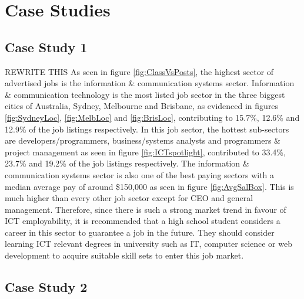\documentclass[twoside, 12pt, a4paper]{article}
\begin{document}
\newpage
\section{Case Studies}
\subsection{Case Study 1}

REWRITE THIS
As seen in figure \ref{fig:ClassVsPosts}, the highest sector of advertised jobs is the information \& communication systems sector. Information \& communication technology is the most listed job sector in the three biggest cities of Australia, Sydney, Melbourne and Brisbane, as evidenced in figures \ref{fig:SydneyLoc}, \ref{fig:MelbLoc} and \ref{fig:BrisLoc}, contributing to 15.7\%, 12.6\% and 12.9\% of the job listings respectively. In this job sector, the hottest sub-sectors are developers/programmers, business/systems analysts and programmers \& project management as seen in figure \ref{fig:ICTspotlight}, contributed to 33.4\%, 23.7\% and 19.2\% of the job listings respectively. The information \& communication systems sector is also one of the best paying sectors with a median average pay of around \$150,000 as seen in figure \ref{fig:AvgSalBox}. This is much higher than every other job sector except for CEO and general management. Therefore, since there is such a strong market trend in favour of ICT employability, it is recommended that a high school student considers a career in this sector to guarantee a job in the future. They should consider learning ICT relevant degrees in university such as IT, computer science or web development to acquire suitable skill sets to enter this job market. 

\subsection{Case Study 2}
\end{document}
